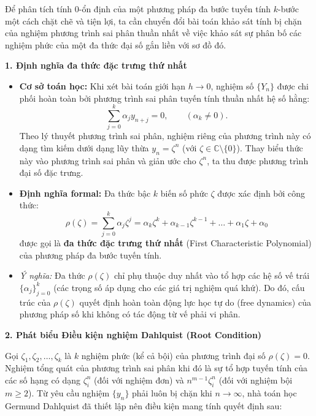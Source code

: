 Để phân tích tính 0-ổn định của một phương pháp đa bước tuyến tính $k$-bước một cách chặt chẽ và tiện lợi, ta cần chuyển đổi bài toán khảo sát tính bị chặn của nghiệm phương trình sai phân thuần nhất về việc khảo sát sự phân bố các nghiệm phức của một đa thức đại số gắn liền với sơ đồ đó.

\vspace{0.5em}
\noindent \textbf{1. Định nghĩa đa thức đặc trưng thứ nhất}
\begin{itemize}
    \item \textbf{Cơ sở toán học:} Khi xét bài toán giới hạn $h \to 0$, nghiệm số $\{Y_n\}$ được chi phối hoàn toàn bởi phương trình sai phân tuyến tính thuần nhất hệ số hằng:
    \[
        \sum_{j=0}^{k} \alpha_j y_{n+j} = 0, \qquad (\alpha_k \neq 0).
    \]
    Theo lý thuyết phương trình sai phân, nghiệm riêng của phương trình này có dạng tìm kiếm dưới dạng lũy thừa $y_n = \zeta^n$ (với $\zeta \in \mathbb{C} \setminus \{0\}$). Thay biểu thức này vào phương trình sai phân và giản ước cho $\zeta^n$, ta thu được phương trình đại số đặc trưng.
    \item \textbf{Định nghĩa formal:} Đa thức bậc $k$ biến số phức $\zeta$ được xác định bởi công thức:
    \begin{equation}
        \rho(\zeta) = \sum_{j=0}^{k} \alpha_j \zeta^j = \alpha_k \zeta^k + \alpha_{k-1} \zeta^{k-1} + \dots + \alpha_1 \zeta + \alpha_0 \tag{3.3}
    \end{equation}
    được gọi là \textbf{đa thức đặc trưng thứ nhất} (First Characteristic Polynomial) của phương pháp đa bước tuyến tính.
    \item \textit{Ý nghĩa:} Đa thức $\rho(\zeta)$ chỉ phụ thuộc duy nhất vào tổ hợp các hệ số vế trái $\{\alpha_j\}_{j=0}^k$ (các trọng số áp dụng cho các giá trị nghiệm quá khứ). Do đó, cấu trúc của $\rho(\zeta)$ quyết định hoàn toàn động lực học tự do (free dynamics) của phương pháp số khi không có tác động từ vế phải vi phân.
\end{itemize}

\vspace{0.5em}
\noindent \textbf{2. Phát biểu Điều kiện nghiệm Dahlquist (Root Condition)}

\noindent Gọi $\zeta_1, \zeta_2, \dots, \zeta_k$ là $k$ nghiệm phức (kể cả bội) của phương trình đại số $\rho(\zeta) = 0$. Nghiệm tổng quát của phương trình sai phân khi đó là sự tổ hợp tuyến tính của các số hạng có dạng $\zeta_i^n$ (đối với nghiệm đơn) và $n^{m-1}\zeta_i^n$ (đối với nghiệm bội $m \ge 2$). Từ yêu cầu nghiệm $\{y_n\}$ phải luôn bị chặn khi $n \to \infty$, nhà toán học Germund Dahlquist đã thiết lập nên điều kiện mang tính quyết định sau:

